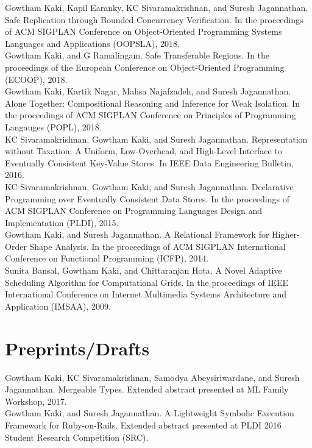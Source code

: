 \documentclass[margin,line]{res}
\begin{document}
\begin{resume}
Gowtham Kaki, Kapil Earanky, KC Sivaramakrishnan, and Suresh
  Jagannathan. Safe Replication through Bounded Concurrency
  Verification. In the proceedings of ACM SIGPLAN Conference on
  Object-Oriented Programming Systems Languages and Applications
  (OOPSLA), 2018.
\vspace*{0.1in}\\
Gowtham Kaki, and G Ramalingam. Safe Transferable Regions.  In the
  proceedings of the European Conference on Object-Oriented
  Programming (ECOOP), 2018.
\vspace*{0.1in}\\
Gowtham Kaki, Kartik Nagar, Mahsa Najafzadeh, and Suresh Jagannathan.
  Alone Together: Compositional Reasoning and Inference for Weak
  Isolation. In the proceedings of ACM SIGPLAN Conference on
  Principles of Programming Langauges (POPL), 2018.
\vspace*{0.1in}\\
KC Sivaramakrishnan, Gowtham Kaki, and Suresh Jagannathan.
  Representation without Taxation: A Uniform, Low-Overhead, and
  High-Level Interface to Eventually Consistent Key-Value Stores. In
  IEEE Data Engineering Bulletin, 2016.
\vspace*{0.1in}\\
KC Sivaramakrishnan, Gowtham Kaki, and Suresh Jagannathan.
  Declarative Programming over Eventually Consistent Data Stores. In
  the proceedings of ACM SIGPLAN Conference on Programming Languages
  Design and Implementation (PLDI), 2015.
\vspace*{0.1in}\\
Gowtham Kaki, and Suresh Jagannathan. A Relational Framework for
  Higher-Order Shape Analysis. In the proceedings of ACM SIGPLAN
  International Conference on Functional Programming (ICFP), 2014.
\vspace*{0.1in}\\
Sunita Bansal, Gowtham Kaki, and Chittaranjan Hota. A Novel Adaptive
  Scheduling Algorithm for Computational Grids. In the proceedings of
  IEEE International Conference on Internet Multimedia Systems
  Architecture and Application (IMSAA), 2009.

\section{Preprints/Drafts}
Gowtham Kaki, KC Sivaramakrishnan, Samodya Abeysiriwardane, and Suresh
  Jagannathan. Mergeable Types. Extended abstract presented at ML
  Family Workshop, 2017.
\vspace*{0.1in}\\
Gowtham Kaki, and Suresh Jagannathan. A Lightweight Symbolic Execution
Framework for Ruby-on-Rails. Extended abstract presented at PLDI 2016
Student Research Competition (SRC).
 

\end{resume}
\end{document}
